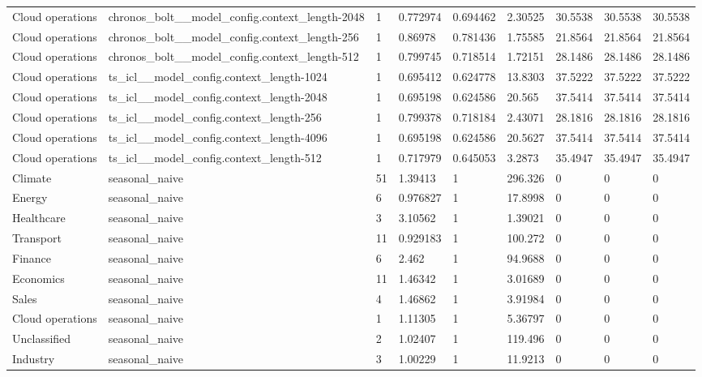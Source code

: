 \begin{tabular}{lllllllll}
Cloud operations & chronos\_bolt\_\_model\_config.context\_length-2048 & 1 & 0.772974 & 0.694462 & 2.30525 & 30.5538 & 30.5538 & 30.5538 \\
Cloud operations & chronos\_bolt\_\_model\_config.context\_length-256 & 1 & 0.86978 & 0.781436 & 1.75585 & 21.8564 & 21.8564 & 21.8564 \\
Cloud operations & chronos\_bolt\_\_model\_config.context\_length-512 & 1 & 0.799745 & 0.718514 & 1.72151 & 28.1486 & 28.1486 & 28.1486 \\
Cloud operations & ts\_icl\_\_model\_config.context\_length-1024 & 1 & 0.695412 & 0.624778 & 13.8303 & 37.5222 & 37.5222 & 37.5222 \\
Cloud operations & ts\_icl\_\_model\_config.context\_length-2048 & 1 & 0.695198 & 0.624586 & 20.565 & 37.5414 & 37.5414 & 37.5414 \\
Cloud operations & ts\_icl\_\_model\_config.context\_length-256 & 1 & 0.799378 & 0.718184 & 2.43071 & 28.1816 & 28.1816 & 28.1816 \\
Cloud operations & ts\_icl\_\_model\_config.context\_length-4096 & 1 & 0.695198 & 0.624586 & 20.5627 & 37.5414 & 37.5414 & 37.5414 \\
Cloud operations & ts\_icl\_\_model\_config.context\_length-512 & 1 & 0.717979 & 0.645053 & 3.2873 & 35.4947 & 35.4947 & 35.4947 \\
Climate & seasonal\_naive & 51 & 1.39413 & 1 & 296.326 & 0 & 0 & 0 \\
Energy & seasonal\_naive & 6 & 0.976827 & 1 & 17.8998 & 0 & 0 & 0 \\
Healthcare & seasonal\_naive & 3 & 3.10562 & 1 & 1.39021 & 0 & 0 & 0 \\
Transport & seasonal\_naive & 11 & 0.929183 & 1 & 100.272 & 0 & 0 & 0 \\
Finance & seasonal\_naive & 6 & 2.462 & 1 & 94.9688 & 0 & 0 & 0 \\
Economics & seasonal\_naive & 11 & 1.46342 & 1 & 3.01689 & 0 & 0 & 0 \\
Sales & seasonal\_naive & 4 & 1.46862 & 1 & 3.91984 & 0 & 0 & 0 \\
Cloud operations & seasonal\_naive & 1 & 1.11305 & 1 & 5.36797 & 0 & 0 & 0 \\
Unclassified & seasonal\_naive & 2 & 1.02407 & 1 & 119.496 & 0 & 0 & 0 \\
Industry & seasonal\_naive & 3 & 1.00229 & 1 & 11.9213 & 0 & 0 & 0 \\
\bottomrule
\end{tabular}

